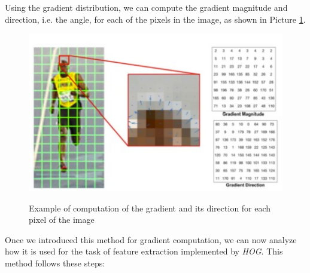 Using the gradient distribution, we can compute the gradient magnitude and direction, i.e. the angle, for each of the pixels in the image, as shown in Picture \ref{gradient_example}.

\begin{figure}[h!]
		\centering
		\includegraphics[scale = 2.0]{img/gradient_example.jpg}
          \label{gradient_example}
          \caption{Example of computation of the gradient and its direction for each pixel of the image}
\end{figure}

Once we introduced this method for gradient computation, we can now analyze how it is used for the task of feature extraction implemented by \textit{HOG}. This method follows these steps:

